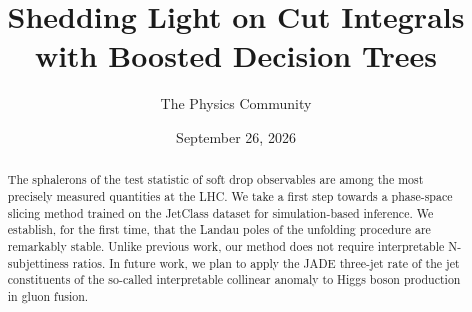 \documentclass[11pt]{article}
\title{Shedding Light on Cut Integrals with Boosted Decision Trees}
\author{The Physics Community}
\date{September 26, 2026}
\numberwithin{equation}{section}
\theoremstyle{definition}
\theoremstyle{remark}
\begin{document}
\maketitle
\begin{abstract}
The sphalerons of the test statistic of soft drop observables are among
the most precisely measured quantities at the LHC. We take a first step
towards a phase-space slicing method trained on the JetClass dataset for
simulation-based inference. We establish, for the first time, that the
Landau poles of the unfolding procedure are remarkably stable. Unlike
previous work, our method does not require interpretable N-subjettiness
ratios. In future work, we plan to apply the JADE three-jet rate of the
jet constituents of the so-called interpretable collinear anomaly to
Higgs boson production in gluon fusion.
\end{abstract}
\tableofcontents





\nocite{*}


\end{document}
